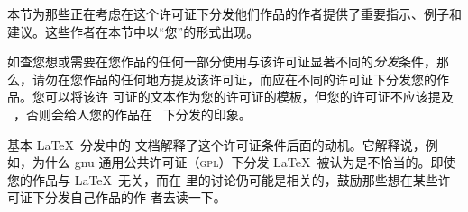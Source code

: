 \begin{LPPLicense}

    本节为那些正在考虑在这个许可证下分发他们作品的作者提供了重要指示、例子和建议。这些作者在本节中以``您''的形式出现。

    \label{LPPL:Choosing}


    如查您想或需要在您作品的任何一部分使用与该许可证显著不同的\emph{分发}条件，那么，请勿在您作品的任何地方提及该许可证，而应在不同的许可证下分发您的作品。您可以将该许 可证的文本作为您的许可证的模板，但您的许可证不应该提及 \LPPL\ ，否则会给人您的作品在 \LPPL\ 下分发的印象。


    基本 \LaTeX\ 分发中的  文档解释了这个许可证条件后面的动机。它解释说，例如，为什么 gnu 通用公共许可证（\textsc{gpl}）下分发 \LaTeX\ 被认为是不恰当的。即使您的作品与 \LaTeX\ 无关，而在  里的讨论仍可能是相关的，鼓励那些想在某些许可证下分发自己作品的作 者去读一下。


    \label{LPPL:WithoutDistribution}



\end{LPPLicense}
